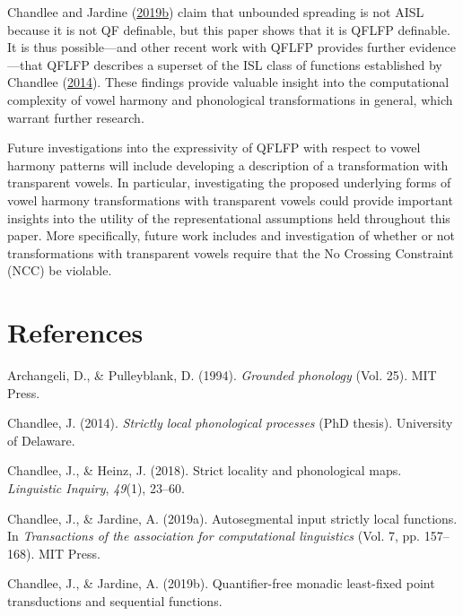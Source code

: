 \documentclass[,doc,floatsintext]{apa6}
\theoremstyle{definition}
\theoremstyle{definition}
\theoremstyle{definition}
\theoremstyle{remark}
\begin{document}
Chandlee and Jardine
(\protect\hyperlink{ref-chandleejardine2019}{2019}\protect\hyperlink{ref-chandleejardine2019}{b})
claim that unbounded spreading is not AISL because it is not QF
definable, but this paper shows that it is QFLFP definable. It is thus
possible---and other recent work with QFLFP provides further
evidence---that QFLFP describes a superset of the ISL class of functions
established by Chandlee (\protect\hyperlink{ref-chandlee2014}{2014}).
These findings provide valuable insight into the computational
complexity of vowel harmony and phonological transformations in general,
which warrant further research.

Future investigations into the expressivity of QFLFP with respect to
vowel harmony patterns will include developing a description of a
transformation with transparent vowels. In particular, investigating the
proposed underlying forms of vowel harmony transformations with
transparent vowels could provide important insights into the utility of
the representational assumptions held throughout this paper. More
specifically, future work includes and investigation of whether or not
transformations with transparent vowels require that the No Crossing
Constraint (NCC) be violable.

\vspace{2in}

\section{References}\label{references}

\begingroup
\setlength{\parindent}{-0.5in} \setlength{\leftskip}{0.5in}

\hypertarget{refs}{}
\hypertarget{ref-archangelipulleyblank1994}{}
Archangeli, D., \& Pulleyblank, D. (1994). \emph{Grounded phonology}
(Vol. 25). MIT Press.

\hypertarget{ref-chandlee2014}{}
Chandlee, J. (2014). \emph{Strictly local phonological processes}
(PhD thesis). University of Delaware.

\hypertarget{ref-chandleeheinz2018}{}
Chandlee, J., \& Heinz, J. (2018). Strict locality and phonological
maps. \emph{Linguistic Inquiry}, \emph{49}(1), 23--60.

\hypertarget{ref-chandleejardineaisl}{}
Chandlee, J., \& Jardine, A. (2019a). Autosegmental input strictly local
functions. In \emph{Transactions of the association for computational
linguistics} (Vol. 7, pp. 157--168). MIT Press.

\hypertarget{ref-chandleejardine2019}{}
Chandlee, J., \& Jardine, A. (2019b). Quantifier-free monadic
least-fixed point transductions and sequential functions.
\end{document}
